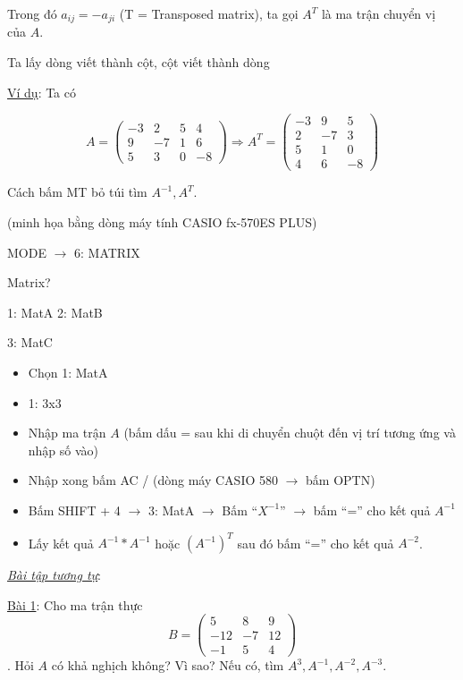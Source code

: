 \documentclass[
]{article}
\let\ul\uline
\begin{document}
Trong đó $a_{ij} = -a_{ji}$ (T =
Transposed matrix), ta gọi
$A^T$ là ma trận
chuyển vị của $A$.

Ta lấy dòng viết thành cột, cột viết thành dòng

\ul{Ví dụ}: Ta có

$$A = \begin{pmatrix} -3 & 2 & 5 & 4 \\ 9 & -7 & 1 & 6 \\ 5 & 3 & 0 & -8 \end{pmatrix} \Rightarrow A^T = \begin{pmatrix} -3 & 9 & 5 \\ 2 & -7 & 3 \\ 5 & 1 & 0 \\ 4 & 6 & -8 \end{pmatrix}$$

Cách bấm MT bỏ túi tìm
$A^{-1}, A^T$.

(minh họa bằng dòng máy tính CASIO fx-570ES PLUS)

MODE \textbf{$\rightarrow$} 6: MATRIX

Matrix?

1: MatA 2: MatB

3: MatC

\begin{itemize}
\item
  Chọn 1: MatA
\item
  1: 3x3
\item
  Nhập ma trận $A$
  (bấm dấu = sau khi di chuyển chuột đến vị trí tương ứng và nhập số
  vào)
\item
  Nhập xong bấm AC / (dòng máy CASIO 580 \textbf{$\rightarrow$} bấm OPTN)
\item
  Bấm SHIFT + 4 \textbf{$\rightarrow$} 3: MatA \textbf{$\rightarrow$} Bấm
  ``$X^{-1}$''
  \textbf{$\rightarrow$} bấm ``='' cho kết quả
  $A^{-1}$
\item
  Lấy kết quả $A^{-1} * A^{-1}$
  hoặc $(A^{-1})^T$ sau đó
  bấm ``='' cho kết quả
  $A^{-2}$.
\end{itemize}

\emph{\ul{Bài tập tương tự}}:

\ul{Bài 1}: Cho ma trận thực
$$B = \begin{pmatrix} 5 & 8 & 9 \\ -12 & -7 & 12 \\ -1 & 5 & 4 \end{pmatrix}$$. Hỏi
$A$ có khả nghịch
không? Vì sao? Nếu có, tìm
$A^3, A^{-1}, A^{-2}, A^{-3}$.
\end{document}
